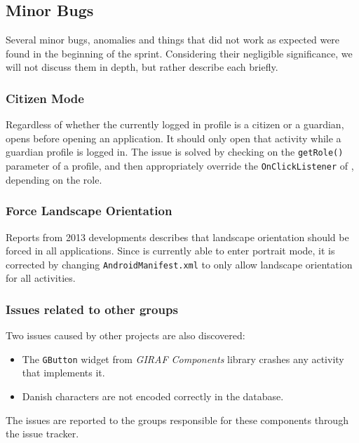 \subsection{Minor Bugs}

Several minor bugs, anomalies and things that did not work as expected were found in the beginning of the sprint.
Considering their negligible significance, we will not discuss them in depth, but rather describe each briefly.

\subsubsection{Citizen Mode}
Regardless of whether the currently logged in profile is a citizen or a guardian, \launcher opens \profileselectionactivity before opening an application.
It should only open that activity while a guardian profile is logged in.
The issue is solved by checking on the \lstinline{getRole()} parameter of a profile, and then appropriately override the \lstinline{OnClickListener} of \profileselectionactivity, depending on the role. 

\subsubsection{Force Landscape Orientation}
Reports from 2013 developments describes that landscape orientation should be forced in all \giraf applications\cite[p. 33]{2013report}.
Since \launcher is currently able to enter portrait mode, it is corrected by changing \lstinline{AndroidManifest.xml} to only allow landscape orientation for all activities\cite{appManifest}.

\subsubsection{Issues related to other groups}
Two issues caused by other projects are also discovered:

\begin{itemize}
\item The \lstinline{GButton} widget from \textit{GIRAF Components} library crashes any activity that implements it.
\item Danish characters are not encoded correctly in the database.
\end{itemize}

The issues are reported to the groups responsible for these components through the issue tracker.